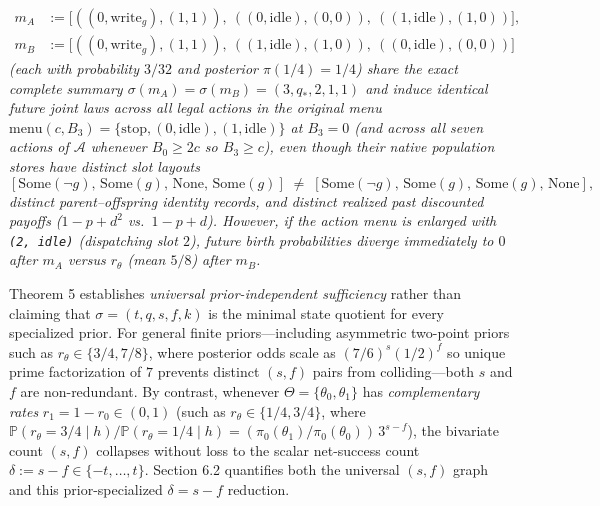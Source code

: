 \documentclass[11pt,a4paper]{article}
\begin{document}
\begin{enumerate}
\[\begin{aligned}
  m_A &:= \bigl[((0,\mathrm{write}_g),(1,1)),\ ((0,\mathrm{idle}),(0,0)),\ ((1,\mathrm{idle}),(1,0))\bigr], \\
  m_B &:= \bigl[((0,\mathrm{write}_g),(1,1)),\ ((1,\mathrm{idle}),(1,0)),\ ((0,\mathrm{idle}),(0,0))\bigr]
  \end{aligned}\] \emph{(each with probability \(3/32\) and posterior
  \(\pi(1/4) = 1/4\)) share the exact complete summary
  \(\sigma(m_A) = \sigma(m_B) = (3, q_*, 2, 1, 1)\) and induce identical
  future joint laws across all legal actions in the original menu
  \(\mathrm{menu}(c, B_3) = \{\mathrm{stop}, (0, \mathrm{idle}), (1, \mathrm{idle})\}\)
  at \(B_3 = 0\) (and across all seven actions of \(\mathcal{A}\)
  whenever \(B_0 \ge 2c\) so \(B_3 \ge c\)), even though their native
  population stores have distinct slot layouts}
  \[[\mathrm{Some}(\neg g),\, \mathrm{Some}(g),\, \mathrm{None},\, \mathrm{Some}(g)]
  \;\neq\;
  [\mathrm{Some}(\neg g),\, \mathrm{Some}(g),\, \mathrm{Some}(g),\, \mathrm{None}],\]
  \emph{distinct parent--offspring identity records, and distinct
  realized past discounted payoffs (\(1 - p + d^2\) vs.~\(1 - p + d\)).
  However, if the action menu is enlarged with \texttt{(2,\ idle)}
  (dispatching slot \(2\)), future birth probabilities diverge
  immediately to \(0\) after \(m_A\) versus \(r_\theta\) (mean \(5/8\))
  after \(m_B\).}
\end{enumerate}

Theorem 5 establishes \emph{universal prior-independent sufficiency}
rather than claiming that \(\sigma = (t, q, s, f, k)\) is the minimal
state quotient for every specialized prior. For general finite
priors---including asymmetric two-point priors such as
\(r_\theta \in \{3/4, 7/8\}\), where posterior odds scale as
\((7/6)^s (1/2)^f\) so unique prime factorization of \(7\) prevents
distinct \((s,f)\) pairs from colliding---both \(s\) and \(f\) are
non-redundant. By contrast, whenever \(\Theta = \{\theta_0, \theta_1\}\)
has \emph{complementary rates} \(r_1 = 1 - r_0 \in (0,1)\) (such as
\(r_\theta \in \{1/4, 3/4\}\), where
\(\mathbb{P}(r_\theta = 3/4 \mid h)/\mathbb{P}(r_\theta = 1/4 \mid h) = (\pi_0(\theta_1)/\pi_0(\theta_0))\,3^{s - f}\)),
the bivariate count \((s,f)\) collapses without loss to the scalar
net-success count \(\delta := s - f \in \{-t, \dots, t\}\). Section 6.2
quantifies both the universal \((s,f)\) graph and this prior-specialized
\(\delta = s - f\) reduction.
\end{document}
